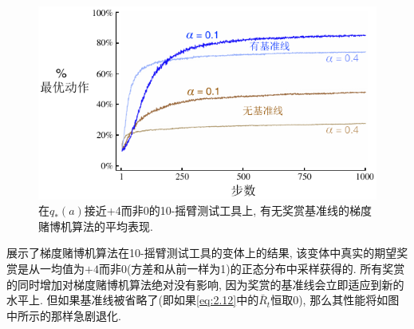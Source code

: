 \begin{figure}[!ht]
\centering
\includegraphics[width=.7\textwidth]{c2/img/figure2-5.pdf}
\caption{在$q_*(a)$接近+4而非0的10-摇臂测试工具上, 有无奖赏基准线的梯度赌博机算法的平均表现.}\label{fig:2.5}
\end{figure}

展示了梯度赌博机算法在10-摇臂测试工具的变体上的结果, 该变体中真实的期望奖赏是从一均值为$+4$而非0(方差和从前一样为1)的正态分布中采样获得的. 所有奖赏的同时增加对梯度赌博机算法绝对没有影响, 因为奖赏的基准线会立即适应到新的水平上. 但如果基准线被省略了(即如果\eqref{eq:2.12}中的$\bar{R}_t$恒取0), 那么其性能将如图中所示的那样急剧退化.

